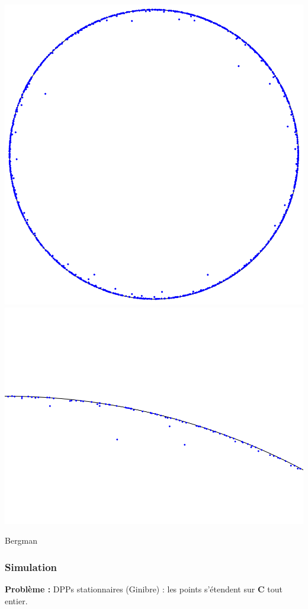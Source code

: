 \documentclass[9pt]{beamer}
\begin{document}
\begin{frame}
\begin{center}
    \includegraphics[scale=0.15]{bergman.png} \includegraphics[scale=0.15]{bergman_zoom.png} 

    Bergman

    \end{center}

\end{frame}\begin{frame}\frametitle{Simulation}

    \textbf{Problème :} DPPs stationnaires (Ginibre) : les points s'étendent sur $ \mathbf C $ tout entier. 


\end{frame}
\end{document}

